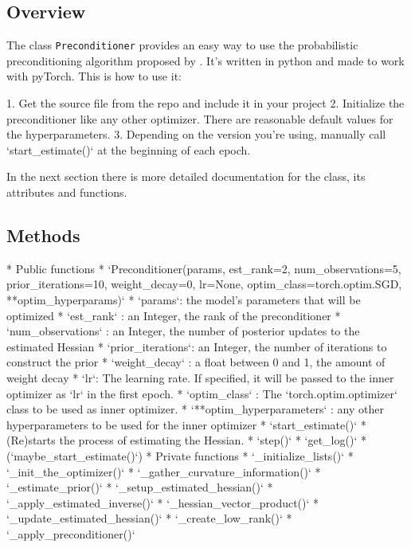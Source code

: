 \documentclass[twoside,12pt,a4paper]{report}
\begin{document}
\subsection{Overview}
The class \verb|Preconditioner| provides an easy way to use the probabilistic preconditioning algorithm proposed by \cite{roos2019active}. It's written in python and made to work with pyTorch.
This is how to use it:

\begin{markdown}
1. Get the source file from the repo and include it in your project
2. Initialize the preconditioner like any other optimizer. There are reasonable default values for the hyperparameters.
3. Depending on the version you're using, manually call `start_estimate()` at the beginning of each epoch.

In the next section there is more detailed documentation for the class, its attributes and functions.
\end{markdown}

\subsection{Methods}
\begin{markdown}
* Public functions
	* `Preconditioner(params, est_rank=2, num_observations=5, prior_iterations=10, weight_decay=0, lr=None,
	optim_class=torch.optim.SGD, **optim_hyperparams)`
		* `params`: the model's parameters that will be optimized
		* `est_rank` : an Integer, the rank of the preconditioner
		* `num_observations` : an Integer, the number of posterior updates to the estimated Hessian
		* `prior_iterations`: an Integer, the number of iterations to construct the prior
		* `weight_decay` : a float between 0 and 1, the amount of weight decay
		* `lr`: The learning rate. If specified, it will be passed to the inner optimizer as `lr` in the first epoch.
		* `optim_class` : The `torch.optim.optimizer` class to be used as inner optimizer.
		* `**optim_hyperparameters` : any other hyperparameters to be used for the inner optimizer
	* `start_estimate()`
		* (Re)starts the process of estimating the Hessian.
	* `step()`
	* `get_log()`
	* (`maybe_start_estimate()`)
* Private functions
	* `_initialize_lists()`
	* `_init_the_optimizer()`
	* `_gather_curvature_information()`
	* `_estimate_prior()`
	* `_setup_estimated_hessian()`
	* `_apply_estimated_inverse()`
	* `_hessian_vector_product()`
	* `_update_estimated_hessian()`
	* `_create_low_rank()`
	* `_apply_preconditioner()`
	
\end{markdown}
\end{document}

